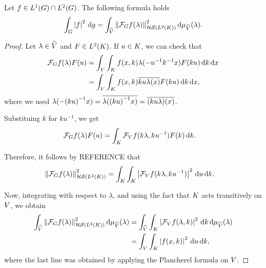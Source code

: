 \begin{proposition}
\label{proposition:Plancherel_formula}
    Let $f \in \Lebesgue{1}{\Group} \cap \Lebesgue{2}{\Group}$.
    The following formula holds
    \begin{align}
        \int_G \abs{f}^2 \dd g = \int_\dualGroup{\VectorSpace} \norm[\HilbertSchmidt{\Lebesgue{2}{\CompactGroup}}]{\Fourier{f}(\lambda)}^2 \dd \Plancherel{\VectorSpace}(\lambda).
        \label{proposition:Plancherel_formula:formula}
    \end{align}
\end{proposition}
\begin{proof}
    Let $\lambda \in \dualGroup{\VectorSpace}$ and $F \in \Lebesgue{2}{\CompactGroup}$.
    If $u \in \CompactGroup$, we can check that
    \begin{align*}
        \Fourier{f}(\lambda) F(u)
        &= \int_\VectorSpace \int_\CompactGroup f(x, k) \lambda(-u^{-1} k^{-1} x) F(k u) \dd k \dd x\\
        &= \int_\VectorSpace \int_\CompactGroup f(x, k) \conj{k u \lambda(x)} F(k u) \dd k \dd x,
    \end{align*}
    where we used $\lambda(-{(k u)}^{-1} x) = \conj{\lambda({(k u)}^{-1} x)} = \conj{(k u \lambda)(x)}$.

    Substituing $k$ for $k u^{-1}$, we get
    \begin{align*}
        \Fourier{f}(\lambda) F(u)
        &= \int_\CompactGroup \Fourier[\VectorSpace]{f}(k \lambda, k u^{-1}) F(k) \dd k.
    \end{align*}

    Therefore, it follows by REFERENCE that
    \begin{align*}
        \norm[\HilbertSchmidt{\Lebesgue{2}{\CompactGroup}}]{\Fourier{f}(\lambda)}^2
        &= \int_\CompactGroup \int_\CompactGroup \abs{\Fourier[\VectorSpace]{f}(k \lambda, k u^{-1})}^2 \dd u \dd k.
    \end{align*}

    Now, integrating with respect to $\lambda$,
    and using the fact that $\CompactGroup$ acts transitively on $\VectorSpace$,
    we obtain
    \begin{align*}
        \int_\dualGroup{\VectorSpace} \norm[\HilbertSchmidt{\Lebesgue{2}{\CompactGroup}}]{\Fourier{f}(\lambda)}^2 \dd \Plancherel{\VectorSpace}(\lambda)
        &= \int_\dualGroup{\VectorSpace} \int_\CompactGroup \abs{\Fourier[\VectorSpace]{f}(\lambda, k)}^2 \dd k \dd \Plancherel{\VectorSpace}(\lambda)\\
        &= \int_\VectorSpace \int_\CompactGroup \abs{f(x, k)}^2 \dd u \dd k,
    \end{align*}
    where the last line was obtained by applying the Plancherel formula on $\VectorSpace$.
\end{proof}

